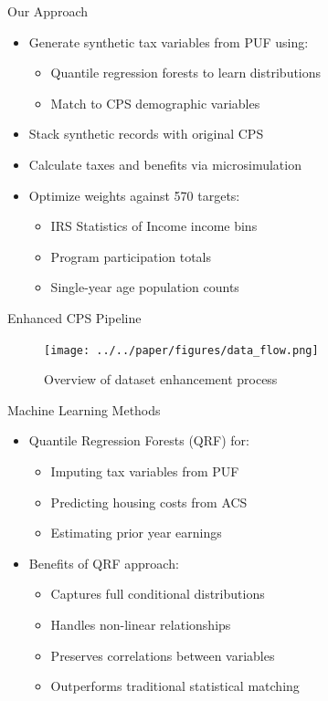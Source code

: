 \documentclass{beamer}
\begin{document}
\begin{frame}{Our Approach}
    \begin{itemize}
        \item Generate synthetic tax variables from PUF using:
        \begin{itemize}
            \item Quantile regression forests to learn distributions
            \item Match to CPS demographic variables
        \end{itemize}
        \pause
        \item Stack synthetic records with original CPS
        \pause
        \item Calculate taxes and benefits via microsimulation
        \pause
        \item Optimize weights against 570 targets:
        \begin{itemize}
            \item IRS Statistics of Income income bins
            \item Program participation totals
            \item Single-year age population counts
        \end{itemize}
    \end{itemize}
\end{frame}

\begin{frame}{Enhanced CPS Pipeline}
    \begin{figure}
        \centering
        \texttt{[image: ../../paper/figures/data\_flow.png]}
        \caption{Overview of dataset enhancement process}
    \end{figure}
\end{frame}

\begin{frame}{Machine Learning Methods}
    \begin{itemize}
        \item Quantile Regression Forests (QRF) for:
        \begin{itemize}
            \item Imputing tax variables from PUF
            \item Predicting housing costs from ACS
            \item Estimating prior year earnings
        \end{itemize}
        \item Benefits of QRF approach:
        \begin{itemize}
            \item Captures full conditional distributions
            \item Handles non-linear relationships
            \item Preserves correlations between variables
            \item Outperforms traditional statistical matching
        \end{itemize}
    \end{itemize}
\end{frame}
\end{document}
